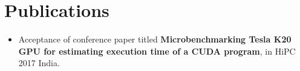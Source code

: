 \section{Publications}
\begin{itemize}[leftmargin=0.15in, label={}]
    \item{Acceptance of conference paper titled \textbf{Microbenchmarking Tesla K20 GPU for estimating execution time of a CUDA program}, in HiPC 2017 India.}
\end{itemize}

